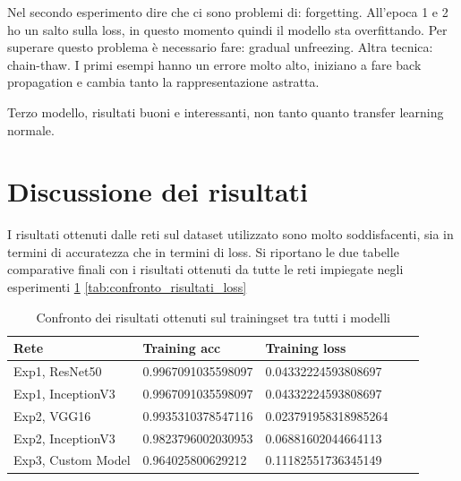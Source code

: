 Nel secondo esperimento dire che ci sono problemi di: forgetting.
All'epoca 1 e 2 ho un salto sulla loss, in questo momento quindi il modello sta overfittando.  
Per superare questo problema è necessario fare: gradual unfreezing.  
Altra tecnica: chain-thaw.  
I primi esempi hanno un errore molto alto, iniziano a fare back propagation e cambia tanto la rappresentazione astratta.

Terzo modello, risultati buoni e interessanti, non tanto quanto transfer learning normale.


\section{Discussione dei risultati}

I risultati ottenuti dalle reti sul dataset utilizzato sono molto soddisfacenti, sia in termini di accuratezza che in termini di loss.
Si riportano le due tabelle comparative finali con i risultati ottenuti da tutte le reti impiegate negli esperimenti \ref{tab:confronto_risultati_training} \ref{tab:confronto_risultati_loss}

\begin{table}[H]
    \begin{tabular}{|l|l|l|l|l|}
    \hline
    \textbf{Rete}                         & \textbf{Training acc} & \textbf{Training loss}   \\ \hline
    Exp1, ResNet50     & 0.9967091035598097     & 0.04332224593808697 \\ \hline
    Exp1, InceptionV3  & 0.9967091035598097     & 0.04332224593808697  \\ \hline
    Exp2, VGG16        & 0.9935310378547116     & 0.023791958318985264  \\ \hline
    Exp2, InceptionV3  & 0.9823796002030953     & 0.06881602044664113   \\ \hline
    Exp3, Custom Model & 0.964025800629212      & 0.11182551736345149     \\ \hline
    \end{tabular}
    \caption{\label{tab:confronto_risultati_training}Confronto dei risultati ottenuti sul trainingset tra tutti i modelli}
\end{table}


